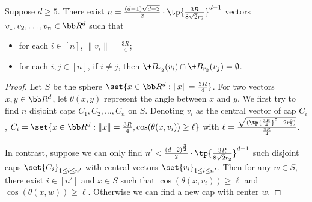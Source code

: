 \begin{lemma}\label{lem:disjointcap}
    Suppose $d\geq 5$. There exist $n=\frac{(d-1)\sqrt{d-2}}{2}\cdot \tp{\frac{3R}{8\sqrt{2}r_2}}^{d-1}$ vectors $v_1,v_2,\dots,v_n \in \bb R^d$ such that
    \begin{itemize}
        \item for each $i\in[n]$, $\|v_i\| = \frac{3R}{4}$;
        \item for each $i,j\in [n]$, if $i\ne j$, then $\+B_{r_2}(v_i)\cap \+B_{r_2}(v_j)=\emptyset$.
    \end{itemize}
\end{lemma}
\begin{proof}
    Let $S$ be the sphere $\set{x\in \bb R^d: \|x\| = \frac{3R}{4}}$. For two vectors $x,y\in \bb R^d$, let $\theta(x,y)$ represent the angle between $x$ and $y$. We first try to find $n$ disjoint caps $C_1,C_2,\dots,C_n$ on $S$. Denoting $v_i$ as the central vector of cap $C_i$, $C_i=\set{x\in \bb R^d: \|x\|=\frac{3R}{4}, \cos(\theta(x,v_i))\geq \ell}$ with $\ell=\frac{\sqrt{(\tp{\frac{3R}{4}}^2-2r_2^2)}}{\frac{3R}{4}}$. 
    
    In contrast, suppose we can only find $n'<\frac{(d-2)^{\frac{3}{2}}}{2}\cdot \tp{\frac{3R}{8\sqrt{2}r_2}}^{d-1}$ such disjoint caps $\set{C_i}_{1\leq i\leq n'}$ with central vectors $\set{v_i}_{1\leq i\leq n'}$. Then for any $w\in S$, there exist $i\in[n']$ and $x\in S$ such that $\cos(\theta(x,v_i))\geq \ell$ and $\cos(\theta(x,w))\geq \ell$. Otherwise we can find a new cap with center $w$.
    

\end{proof}
